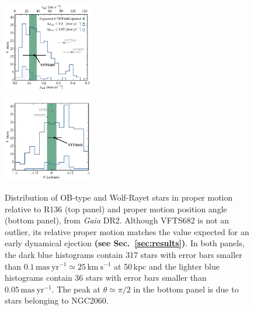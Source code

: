 \documentclass[a4paper,fleqn,usenatbib]{mnras}
\newcommand{\newtext}[1]{{\color{ForestGreen}\bf{#1}}}
\newcommand{\kms}{{\,\mathrm{km\ s^{-1}}}}
\DeclareRobustCommand{\Secref}[1]{Sec.~\ref{#1}}
\begin{document}
\begin{figure}%
  \centering
  \includegraphics[width=0.35\textwidth]{figures/dist_mu_region.pdf}\\
  \vspace*{-5pt}
  \includegraphics[width=0.35\textwidth]{figures/angle}
  \vspace{-5pt}
  \caption{Distribution of OB-type and Wolf-Rayet stars in proper
    motion relative to R136 (top panel) and proper motion position angle
    (bottom panel), from \emph{Gaia} DR2. Although VFTS682 is not an outlier, its relative
    proper motion matches the value expected for an early dynamical
    ejection \newtext{(see \Secref{sec:results})}. In both
    panels, the dark blue histograms contain 317 
    stars with error bars smaller than $0.1\,\mathrm{mas \
      yr^{-1}}\simeq25\,\mathrm{km\ s^{-1}}$ at 50\,kpc and the
    lighter blue histograms contain 36 stars with error bars smaller than $0.05\,\mathrm{mas \
    yr^{-1}}$. The peak at $\theta\simeq\pi/2$ in the bottom panel is due to stars
  belonging to NGC2060.}
\vspace{-5pt}
  \label{fig:dist}
\end{figure}
\end{document}
